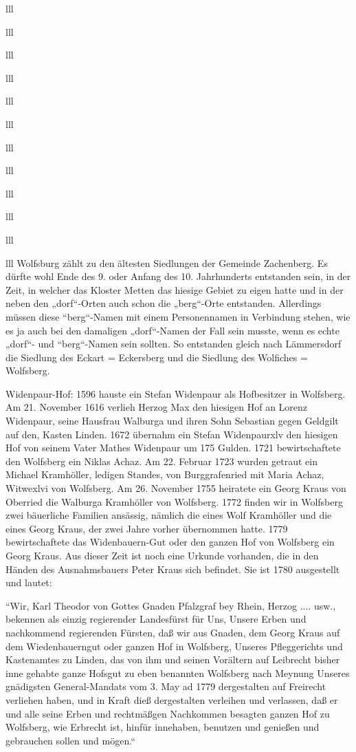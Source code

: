 \documentclass[12pt,a4pager]{book}
\begin{document}
\begin{tabuluar}{lll}
\begin{tabuluar}{lll}
\begin{tabuluar}{lll}
\begin{tabuluar}{lll}
\begin{tabuluar}{lll}
\begin{tabuluar}{lll}
\begin{tabuluar}{lll}
\begin{tabuluar}{lll}
\begin{tabuluar}{lll}
\begin{tabuluar}{lll}
\begin{tabuluar}{lll}
\begin{tabuluar}{lll}
Wolfsburg zählt zu den ältesten Siedlungen der Gemeinde Zachenberg. Es dürfte
wohl Ende des 9. oder Anfang des 10. Jahrhunderts entstanden sein, in der Zeit,
in welcher das Kloster Metten das hiesige Gebiet zu eigen hatte und in der neben
den „dorf“-Orten auch schon die „berg“-Orte entstanden. Allerdings müssen diese
“berg“-Namen mit einem Personennamen in Verbindung stehen, wie es ja auch bei
den damaligen „dorf“-Namen der Fall sein musste, wenn es echte „dorf“- und
“berg“-Namen sein sollten. So entstanden gleich nach Lämmersdorf die Siedlung
des Eckart = Eckersberg und die Siedlung des Wolfiches = Wolfsberg.

Widenpaur-Hof: 1596 hauste ein Stefan Widenpaur als Hofbesitzer in Wolfsberg. Am
21. November 1616 verlieh Herzog Max den hiesigen Hof an Lorenz Widenpaur, seine
Hausfrau Walburga und ihren Sohn Sebastian gegen Geldgilt auf den, Kasten
Linden. 1672 übernahm ein Stefan Widenpaurxlv den hiesigen Hof von seinem Vater
Mathes Widenpaur um 175 Gulden. 1721 bewirtschaftete den Wolfsberg ein Niklas
Achaz. Am 22. Februar 1723 wurden getraut ein Michael Kramhöller, ledigen
Standes, von Burggrafenried mit Maria Achaz, Witwexlvi von Wolfsberg. Am 26.
November 1755 heiratete ein Georg Kraus von Oberried die Walburga Kramhöller von
Wolfsberg. 1772 finden wir in Wolfsberg zwei bäuerliche Familien ansässig,
nämlich die eines Wolf Kramhöller und die eines Georg Kraus, der zwei Jahre
vorher übernommen hatte. 1779 bewirtschaftete das Widenbauern-Gut oder den
ganzen Hof von Wolfsberg ein Georg Kraus. Aus dieser Zeit ist noch eine Urkunde
vorhanden, die in den Händen des Ausnahmsbauers Peter Kraus sich befindet. Sie
ist 1780 ausgestellt und lautet:

“Wir, Karl Theodor von Gottes Gnaden Pfalzgraf bey Rhein, Herzog .... usw.,
bekennen als einzig regierender Landesfürst für Uns, Unsere Erben und
nachkommend regierenden Fürsten, daß wir aus Gnaden, dem Georg Kraus auf dem
Wiedenbauerngut oder ganzen Hof in Wolfsberg, Unseres Pfleggerichts und
Kastenamtes zu Linden, das von ihm und seinen Vorältern auf Leibrecht bisher
inne gehabte ganze Hofsgut zu eben benannten Wolfsberg nach Meynung Unseres
gnädigsten General-Mandats vom 3. May ad 1779 dergestalten auf Freirecht
verliehen haben, und in Kraft dieß dergestalten verleihen und verlassen, daß er
und alle seine Erben und rechtmäßgen Nachkommen besagten ganzen Hof zu
Wolfsberg, wie Erbrecht ist, hinfür innehaben, benutzen und genießen und
gebrauchen sollen und mögen.“


\end{tabuluar}
\end{tabuluar}
\end{tabuluar}
\end{tabuluar}
\end{tabuluar}
\end{tabuluar}
\end{tabuluar}
\end{tabuluar}
\end{tabuluar}
\end{tabuluar}
\end{tabuluar}
\end{tabuluar}
\end{document}
